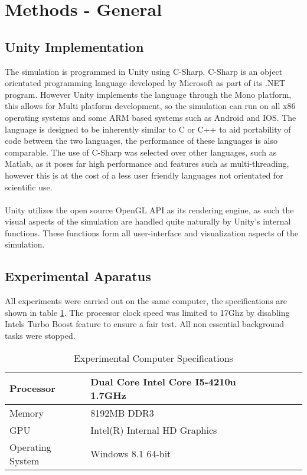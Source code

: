 \section{Methods - General}
\subsection{Unity Implementation}
The simulation is programmed in Unity using C-Sharp. C-Sharp is an object orientated programming language developed by Microsoft as part of its .NET program. However Unity implements the language through the Mono platform, this allows for Multi platform development, so the simulation can run on all x86 operating systems and some ARM based systems such as Android and IOS. The language is designed to be inherently similar to C or C++ to aid portability of code between the two languages, the performance of these languages is also comparable. The use of C-Sharp was selected over other languages, such as Matlab, as it poses far high performance and features such as multi-threading, however this is at the cost of a less user friendly languages not orientated for scientific use. 
\\\\
Unity utilizes the open source OpenGL API as its rendering engine, as such the visual aspects of the simulation are handled quite naturally by Unity's internal functions. These functions form all user-interface and visualization aspects of the simulation. 

\subsection{Experimental Aparatus}
All experiments were carried out on the same computer, the specifications are shown in table \ref{my-label}. The processor clock speed was limited to 17Ghz by disabling Intels Turbo Boost feature to ensure a fair test. All non essential background tasks were stopped.

\begin{table}[H]
\centering

\begin{tabular}{l|lllll}
Processor        & Dual Core Intel Core I5-4210u 1.7GHz \\ \hline
Memory           & 8192MB DDR3                          \\ \cline{1-2}
GPU              & Intel(R) Internal HD Graphics        \\ \cline{1-2}
Operating System & Windows 8.1 64-bit                    
\end{tabular}

\caption{Experimental Computer Specifications}
\label{my-label}
\end{table}



